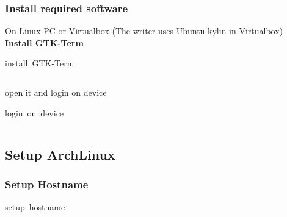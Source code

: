 \documentclass[11pt, a4paper,ngerman]{article}
\begin{document}
\subsubsection{Install required software}

On Linux-PC or Virtualbox (The writer uses Ubuntu kylin in Virtualbox)\\ 

\textbf{Install GTK-Term} \\

\begin{mintedbox}[breakable=true,
 bottomrule=0.5mm,
 width=\paperwidth-3cm,
 boxsep=1mm, 
 enhanced=true,
 colframe = monoblack,
 drop fuzzy shadow,
 colback = black
 ]{install\ GTK-Term}%
 

     \inputminted[firstline=49,lastline=49, 
     linenos=true, framesep=2mm, mathescape, numbersep=5pt,tabsize=4,%
]{bash}{includes/archlinux.sh}%

\end{mintedbox}%
\vspace{0.4cm}

open it and login on device \\

\begin{mintedbox}[breakable=true,
 bottomrule=0.5mm,
 width=\paperwidth-3cm,
 boxsep=1mm, 
 enhanced=true,
 colframe = monoblack,
 drop fuzzy shadow,
 colback = black
 ]{login\ on\ device}%
 

     \inputminted[firstline=54,lastline=60, 
     linenos=true, framesep=2mm, mathescape, numbersep=5pt,tabsize=4,%
]{bash}{includes/archlinux.sh}%

\end{mintedbox}%
\vspace{-0.2cm}

\subsection{Setup ArchLinux}
\subsubsection{Setup Hostname}

\begin{mintedbox}[breakable=true,
 bottomrule=0.5mm,
 width=\paperwidth-3cm,
 boxsep=1mm, 
 enhanced=true,
 colframe = monoblack,
 drop fuzzy shadow,
 colback = black
 ]{setup\ hostname}%
 

     \inputminted[firstline=67,lastline=67, 
     linenos=true, framesep=2mm, mathescape, numbersep=5pt,tabsize=4,%
]{bash}{includes/archlinux.sh}%

\end{mintedbox}%
\vspace{0.4cm}
\end{document}
